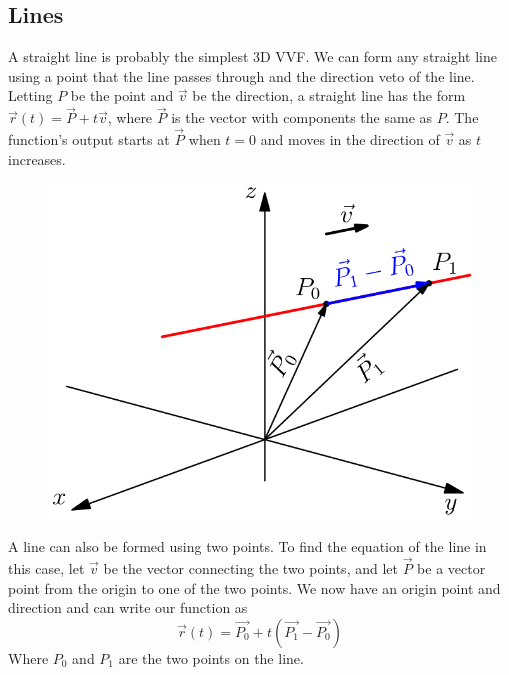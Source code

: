 \subsection{Lines}
\noindent
A straight line is probably the simplest 3D VVF. We can form any straight line using a point that the line passes through and the direction veto of the line.\\
Letting $P$ be the point and $\vec{v}$ be the direction, a straight line has the form $\vec{r}(t) = \vec{P}+t\vec{v}$, where $\vec{P}$ is the vector with components the same as $P$. The function's output starts at $\vec{P}$ when $t=0$ and moves in the direction of $\vec{v}$ as $t$ increases.

\begin{figure}[h]
	\centering
	\includegraphics[scale=0.33]{Images/vectorValuedFunctions/VectorLine}
\end{figure}

\noindent
A line can also be formed using two points. To find the equation of the line in this case, let $\vec{v}$ be the vector connecting the two points, and let $\vec{P}$ be a vector point from the origin to one of the two points. We now have an origin point and direction and can write our function as
\begin{equation*}
	\vec{r}(t) = \vec{P_0} + t\left(\vec{P_1} - \vec{P_0}\right)	
\end{equation*}
 Where $P_0$ and $P_1$ are the two points on the line.